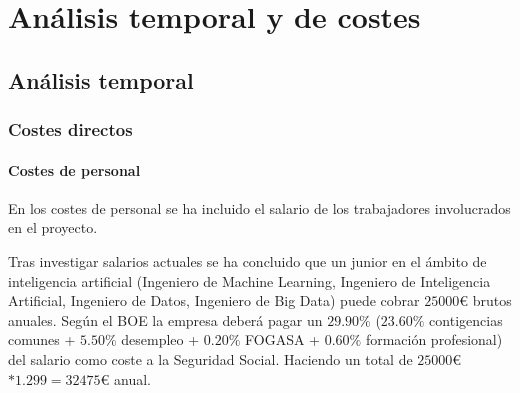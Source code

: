 \chapter{An\'alisis temporal y de costes}\label{anatemporal}

\section{Análisis temporal} 



\subsection{Costes directos}\label{sec:costesdirectos}

\subsubsection{Costes de personal}\label{subsec:personal}

En los costes de personal se ha incluido el salario de los trabajadores involucrados en el proyecto. 

Tras investigar salarios actuales se ha concluido que un junior en el ámbito de inteligencia artificial (Ingeniero de Machine Learning, Ingeniero de Inteligencia Artificial, Ingeniero de Datos, Ingeniero de Big Data) puede cobrar $25000 $€$ $ brutos anuales. Según el BOE \cite{BOE} la empresa deberá pagar un $29.90\%$ ($23.60\%$ contigencias comunes + $5.50\%$ desempleo + $0.20\%$ FOGASA + $0.60\%$ formación profesional) del salario como coste a la Seguridad Social. Haciendo un total de $25000 $€$ * 1.299 = 32475 $€ anual.

